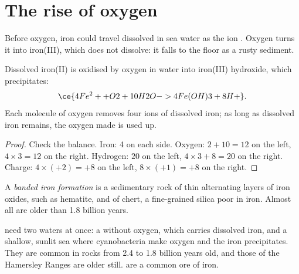 \section{The rise of oxygen}

Before oxygen, iron could travel dissolved in sea water as the ion
. Oxygen turns it into iron(III), which does not dissolve: it falls
to the floor as a rusty sediment.

\begin{proposition}\label{prop:g12:early-earth:iron}
Dissolved iron(II) is oxidised by oxygen in water into iron(III) hydroxide,
which precipitates:
\[
  \ce{4Fe^2+ + O2 + 10H2O -> 4Fe(OH)3 + 8H+} .
\]
Each molecule of oxygen removes four ions of dissolved iron; as long as
dissolved iron remains, the oxygen made is used up.
\end{proposition}

\begin{proof}
Check the balance. Iron: 4 on each side. Oxygen: $2 + 10 = 12$ on the left,
$4 \times 3 = 12$ on the right. Hydrogen: $20$ on the left, $4 \times 3 + 8 =
20$ on the right. Charge: $4 \times (+2) = +8$ on the left, $8 \times (+1) =
+8$ on the right.
\end{proof}

\begin{definition}\label{def:g12:early-earth:bif}
A \emph{banded iron formation} is a
sedimentary rock of thin alternating layers of iron oxides, such as
hematite, and of chert, a fine-grained silica poor in iron. Almost all are
older than 1.8 billion years.
\end{definition}

 need two waters at once: a  without oxygen,
which carries dissolved iron, and a shallow, sunlit sea where cyanobacteria
make oxygen and the iron precipitates. They are common in rocks from 2.4 to
1.8 billion years old, and those of the Hamersley Ranges are older still.
 are a common ore of iron.

